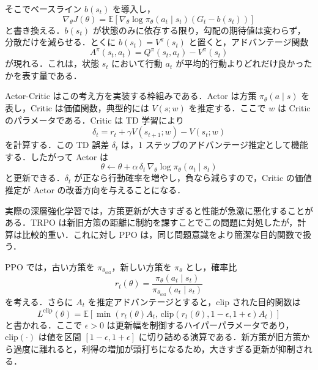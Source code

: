 そこでベースライン $b(s_t)$ を導入し，
\begin{equation*}
\nabla_\theta J(\theta)
=
\mathbb{E}\left[
\nabla_\theta \log \pi_\theta(a_t \mid s_t)
\left(G_t - b(s_t)\right)
\right]
\end{equation*}
と書き換える．$b(s_t)$ が状態のみに依存する限り，勾配の期待値は変わらず，分散だけを減らせる．とくに $b(s_t)=V^\pi(s_t)$ と置くと，アドバンテージ関数
\begin{equation*}
A^\pi(s_t,a_t) = Q^\pi(s_t,a_t) - V^\pi(s_t)
\end{equation*}
が現れる．これは，状態 $s_t$ において行動 $a_t$ が平均的行動よりどれだけ良かったかを表す量である．

Actor-Critic はこの考え方を実装する枠組みである．Actor は方策 $\pi_\theta(a \mid s)$ を表し，Critic は価値関数，典型的には $V(s;w)$ を推定する．ここで $w$ は Critic のパラメータである．Critic は TD 学習により
\begin{equation*}
\delta_t = r_t + \gamma V(s_{t+1};w) - V(s_t;w)
\end{equation*}
を計算する．この TD 誤差 $\delta_t$ は，1 ステップのアドバンテージ推定として機能する．したがって Actor は
\begin{equation*}
\theta \leftarrow \theta + \alpha \, \delta_t \, \nabla_\theta \log \pi_\theta(a_t \mid s_t)
\end{equation*}
と更新できる．$\delta_t$ が正なら行動確率を増やし，負なら減らすので，Critic の価値推定が Actor の改善方向を与えることになる．

実際の深層強化学習では，方策更新が大きすぎると性能が急激に悪化することがある．TRPO は新旧方策の距離に制約を課すことでこの問題に対処したが\cite{Schulman2015}，計算は比較的重い．これに対し PPO は，同じ問題意識をより簡潔な目的関数で扱う\cite{Schulman2017}．

PPO では，古い方策を $\pi_{\theta_{\mathrm{old}}}$，新しい方策を $\pi_\theta$ とし，確率比
\begin{equation*}
r_t(\theta)
=
\frac{\pi_\theta(a_t \mid s_t)}{\pi_{\theta_{\mathrm{old}}}(a_t \mid s_t)}
\end{equation*}
を考える．さらに $A_t$ を推定アドバンテージとすると，clip された目的関数は
\begin{equation*}
L^{\mathrm{clip}}(\theta)
=
\mathbb{E}
\left[
\min\left(
r_t(\theta)A_t,\,
\mathrm{clip}\left(r_t(\theta),1-\epsilon,1+\epsilon\right)A_t
\right)
\right]
\end{equation*}
と書かれる．ここで $\epsilon > 0$ は更新幅を制御するハイパーパラメータであり，$\mathrm{clip}(\cdot)$ は値を区間 $[1-\epsilon,1+\epsilon]$ に切り詰める演算である．新方策が旧方策から過度に離れると，利得の増加が頭打ちになるため，大きすぎる更新が抑制される．

